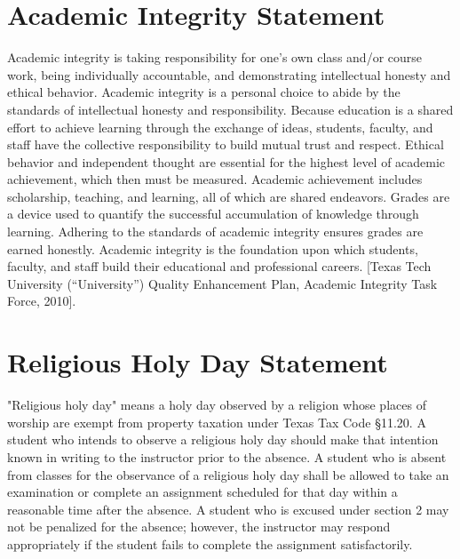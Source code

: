 \documentclass[12pt, notitlepage]{article}   	%
\begin{document}
{\section{Academic Integrity Statement}
Academic integrity is taking responsibility for one’s own class and/or course work, being individually accountable, and demonstrating intellectual honesty and ethical behavior. Academic integrity is a personal choice to abide by the standards of intellectual honesty and responsibility. Because education is a shared effort to achieve learning through the exchange of ideas, students, faculty, and staff have the collective responsibility to build mutual trust and respect. Ethical behavior and independent thought are essential for the highest level of academic achievement, which then must be measured. Academic achievement includes scholarship, teaching, and learning, all of which are shared endeavors. Grades are a device used to quantify the successful accumulation of knowledge through learning. Adhering to the standards of academic integrity ensures grades are earned honestly. Academic integrity is the foundation upon which students, faculty, and staff build their educational and professional careers. [Texas Tech University (“University”) Quality Enhancement Plan, Academic Integrity Task Force, 2010].

 \section{Religious Holy Day Statement}
"Religious holy day" means a holy day observed by a religion whose places of worship are exempt from property taxation under Texas Tax Code §11.20. A student who intends to observe a religious holy day should make that intention known in writing to the instructor prior to the absence. A student who is absent from classes for the observance of a religious holy day shall be allowed to take an examination or complete an assignment scheduled for that day within a reasonable time after the absence. A student who is excused under section 2 may not be penalized for the absence; however, the instructor may respond appropriately if the student fails to complete the assignment satisfactorily.


}
\end{document}
